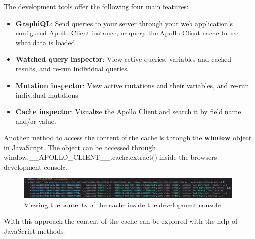 The development tools offer the following four main features: \cite{misc:-:background:graphql:apollo-developer-tools}

\begin{itemize}
    \item \textbf{GraphiQL}: Send queries to your server through your web application's configured Apollo Client instance, or query the Apollo Client cache to see what data is loaded.
    \item \textbf{Watched query inspector}: View active queries, variables and cached results, and re-run individual queries.
    \item \textbf{Mutation inspector}: View active mutations and their variables, and re-run individual mutations
    \item \textbf{Cache inspector}: Visualize the Apollo Client and search it by field name and/or value.
\end{itemize}

Another method to access the content of the cache is through the \textbf{window} object in JavaScript. The object can be accessed through window.\_\_APOLLO\_CLIENT\_\_.cache.extract() inside the browsers development console.

\ifshowImages
\begin{figure}[H]
    \centering
    \includegraphics[width=1\linewidth]{images/background/apollo/apollo-cache-browser-window.jpeg}
    \caption{Viewing the contents of the cache inside the development console}\label{fig:background:graphql:apollo:apollo-cache-browser-window}
\end{figure}
\fi

With this approach the content of the cache can be explored with the help of JavaScript methods.




